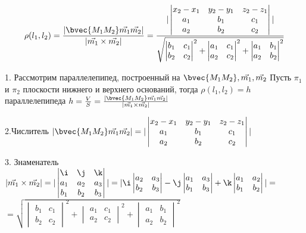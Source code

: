 $$\rho(l_1, l_2) = \frac{ |\bvec{M_1M_2}\vec{m_1}\vec{m_2}| }{ |\vec{m_1}\times\vec{m_2}| }=
\frac{ |\begin{vmatrix}x_2-x_1&y_2-y_1&z_2-z_1\\a_1&b_1&c_1\\a_2&b_2&c_2\end{vmatrix}| }
    {\sqrt{\begin{vmatrix}b_1&c_1\\b_2&c_2\end{vmatrix}^2+
    \begin{vmatrix}a_1&c_1\\a_2&c_2\end{vmatrix}^2+
    \begin{vmatrix}a_1&b_1\\a_2&b_2\end{vmatrix}^2}}$$

1. Рассмотрим параллелепипед, построенный на $\bvec{M_1M_2}, \vec{m_1}, \vec{m_2}$
Пусть $\pi_1$ и $\pi_2$ плоскости нижнего и верхнего оснований, тогда $\rho(l_1, l_2) = h$ параллелепипеда
$h = \frac{V}{S} = \frac{ |\bvec{M_1M_2}\vec{m_1}\vec{m_2}| }{ |\vec{m_1}\times\vec{m_2}| }$

2.Числитель $|\bvec{M_1M_2}\vec{m_1}\vec{m_2}| =  |\begin{vmatrix}x_2-x_1&y_2-y_1&z_2-z_1\\
a_1&b_1&c_1\\a_2&b_2&c_2\end{vmatrix}|$

3. Знаменатель $|\vec{m_1}\times\vec{m_2}| = |\begin{vmatrix}
    \i&\j&\k\\
    a_1 & a_2 & a_3\\
    b_1 & b_2 & b_3
\end{vmatrix}| = |\i
\begin{vmatrix}
    a_2 & a_3\\
    b_2 & b_3
\end{vmatrix} - \j
\begin{vmatrix}
    a_1 & a_3\\
    b_1 & b_3
\end{vmatrix} + \k
\begin{vmatrix}
    a_1 & a_2\\
    b_1 & b_2
\end{vmatrix}| = $ \\
$=\sqrt{\begin{vmatrix}b_1&c_1\\b_2&c_2\end{vmatrix}^2+
\begin{vmatrix}a_1&c_1\\a_2&c_2\end{vmatrix}^2+
\begin{vmatrix}a_1&b_1\\a_2&b_2\end{vmatrix}^2}$

